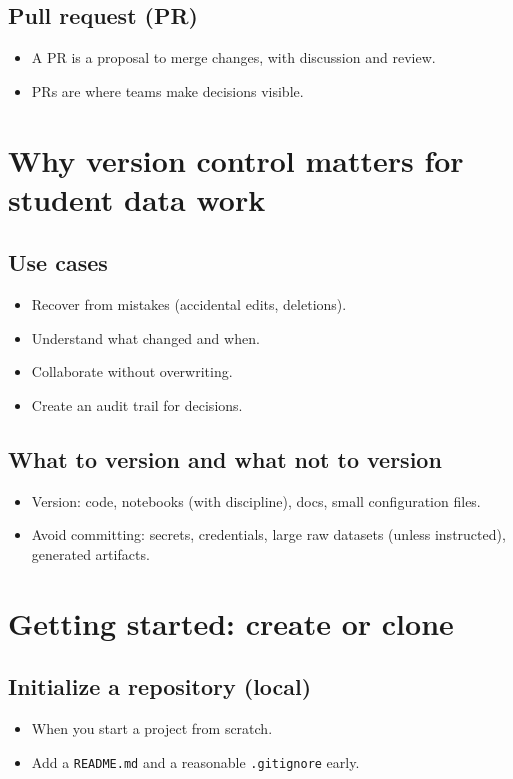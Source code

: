 \subsection{Pull request (PR)}
\begin{itemize}
\item A PR is a proposal to merge changes, with discussion and review.
\item PRs are where teams make decisions visible.
\end{itemize}

\section{Why version control matters for student data work}
\subsection{Use cases}
\begin{itemize}
\item Recover from mistakes (accidental edits, deletions).
\item Understand what changed and when.
\item Collaborate without overwriting.
\item Create an audit trail for decisions.
\end{itemize}

\subsection{What to version and what not to version}
\begin{itemize}
\item Version: code, notebooks (with discipline), docs, small configuration files.
\item Avoid committing: secrets, credentials, large raw datasets (unless instructed), generated artifacts.
\end{itemize}

\section{Getting started: create or clone}
\subsection{Initialize a repository (local)}
\begin{itemize}
\item When you start a project from scratch.
\item Add a \texttt{README.md} and a reasonable \texttt{.gitignore} early.
\end{itemize}

